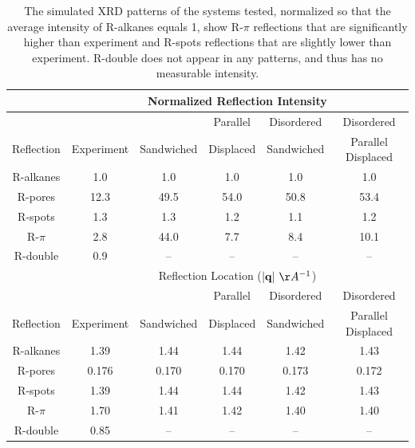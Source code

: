 \documentclass[journal=jpcbfk,manuscript=article]{achemso}
\begin{document}
  \begin{table}[h]
  \centering
  \begin{tabular}{c|ccccc}
  \toprule
 		     & \multicolumn{5}{c}{Normalized Reflection Intensity}                   \\
  \hline
             &            &            & Parallel  & Disordered & Disordered         \\
  Reflection & Experiment & Sandwiched & Displaced & Sandwiched & Parallel Displaced \\
  \midrule
  R-alkanes  & 1.0        &  1.0       &  1.0      & 1.0        & 1.0                \\
  R-pores    & 12.3       &  49.5      &  54.0     & 50.8       & 53.4               \\
  R-spots    & 1.3        &  1.3       &  1.2      & 1.1        & 1.2                \\
  R-$\pi$    & 2.8        & 44.0       &  7.7      & 8.4        & 10.1               \\
  R-double   & 0.9        &  --        & --        &  --        & --                 \\ 
  \hline
   		     & \multicolumn{5}{c}{Reflection Location ($|\mathbf{q}|~\AA^{-1}$)}     \\
  \hline
             &            &            & Parallel  & Disordered & Disordered         \\
  Reflection & Experiment & Sandwiched & Displaced & Sandwiched & Parallel Displaced \\
  \midrule
  R-alkanes  & 1.39       &  1.44      &  1.44     & 1.42       & 1.43               \\  
  R-pores    & 0.176      &  0.170     &  0.170    & 0.173      & 0.172              \\
  R-spots    & 1.39       &  1.44      &  1.44     & 1.42       & 1.43               \\
  R-$\pi$    & 1.70       &  1.41      &  1.42     & 1.40       & 1.40               \\
  R-double   & 0.85       &  --        & --        &  --        & --                 \\ 
  \bottomrule
  \end{tabular}
  \caption{The simulated XRD patterns of the systems tested, normalized so that the average 
  intensity of R-alkanes equals 1, show R-$\pi$ reflections that are significantly higher 
  than experiment and R-spots reflections that are slightly lower than experiment. R-double
  does not appear in any patterns, and thus has no measurable intensity.}
  \label{table:relative_inensities_300K} 
  \end{table}  
  
\end{document}
